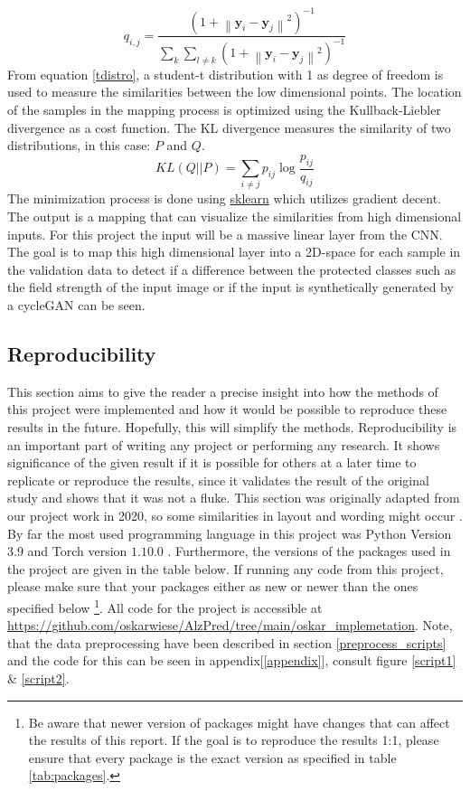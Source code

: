 \documentclass[12pt, fleqn, titlepage]{article}
\newcommand{\norm}[1]{\left\lVert#1\right\rVert}
\newcommand{\1}[1]{\mathds{1}\left[#1\right]}
\begin{document}
\begin{equation}\label{tdistro}
	q_{i,j} = \frac{(1 + \norm{\mathbf y_i - \mathbf y_j}^2)^{-1}}{\sum_k \sum_{l \neq k}(1 + \norm{\mathbf y_i - \mathbf y_j}^2)^{-1}}
\end{equation}
From equation \eqref{tdistro}, a student-t distribution with 1 as degree of freedom is used to measure the similarities between the low dimensional points. 
The location of the samples in the mapping process is optimized using the Kullback-Liebler divergence as a cost function. The KL divergence measures the similarity of two distributions, in this case: $ P $ and $ Q $. 
\begin{equation*}\label{key}
	KL(Q \vert \vert P) = \sum_{i \neq j} p_{ij} \log \frac{p_{ij}}{q_{ij}}
\end{equation*} 
The minimization process is done using \href{https://scikit-learn.org/stable/modules/generated/sklearn.manifold.TSNE.html}{sklearn} which utilizes gradient decent. The output is a mapping that can visualize the similarities from high dimensional inputs. For this project the input will be a massive linear layer from the CNN. The goal is to map this high dimensional layer into a 2D-space for each sample in the validation data to detect if a difference between the protected classes such as the field strength of the input image or if the input is synthetically generated by a cycleGAN can be seen.


\subsection{Reproducibility}\label{reproducibility}
This section aims to give the reader a precise insight into how the methods of this project were implemented and how it would be possible to reproduce these results in the future. Hopefully, this will simplify the methods. Reproducibility is an important part of writing any project or performing any research. It shows significance of the given result if it is possible for others at a later time to replicate or reproduce the results, since it validates the result of the original study and shows that it was not a fluke. This section was originally adapted from our project work in 2020, so some similarities in layout and wording might occur \cite{fagproject}. By far the most used programming language in this project was Python Version 3.9 and Torch version $ 1.10.0 $ \cite{python, pytorch}.
Furthermore, the versions of the packages used in the project are given in the table below. If running any code from this project, please make sure that your packages either as new or newer than the ones specified below \footnote{Be aware that newer version of packages might have changes that can affect the results of this report. If the goal is to reproduce the results 1:1, please ensure that every package is the exact version as specified in table \ref{tab:packages}.}. All code for the project is accessible at \url{https://github.com/oskarwiese/AlzPred/tree/main/oskar_implemetation}. Note, that the data preprocessing have been described in section \ref{preprocess_scripts} and the code for this can be seen in appendix[\ref{appendix}], consult figure \ref{script1} \& \ref{script2}. 
\end{document}
